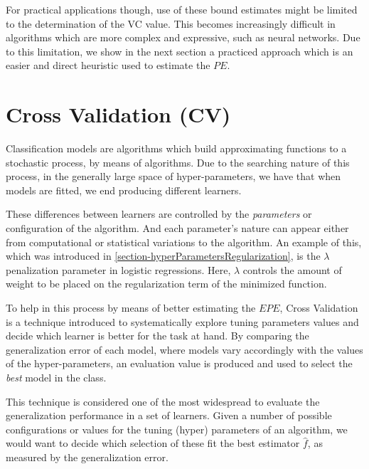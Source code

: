 For practical applications though, use of these bound estimates might be limited to the determination of the VC value. This becomes increasingly difficult in algorithms which are more complex and expressive, such as neural networks. 
Due to this limitation, we show in the next section a practiced approach which is an easier and direct heuristic used to estimate the $PE$.



\section{Cross Validation (CV)}\label{section:crossValidation}

Classification models are algorithms which build approximating functions to a stochastic process, by means of algorithms. Due to the searching nature of this process, in the generally large space of hyper-parameters, we have that when models are fitted, we end producing different learners. 
 
These differences between learners are controlled by the \textit{parameters} or configuration of the algorithm. 
And each parameter's nature can appear either from computational or statistical variations to the algorithm.
An example of this, which was introduced in \cref{section-hyperParametersRegularization}, is the $\lambda$ penalization parameter in logistic regressions. 
Here, $\lambda$ controls the amount of weight to be placed on the regularization term of the minimized function.

To help in this process by means of better estimating the $EPE$, Cross Validation is a technique introduced to systematically explore tuning parameters values and decide which learner is better for the task at hand. 
By comparing the generalization error of each model, where models vary accordingly with the values of the hyper-parameters, an evaluation value is produced and used to select the \textit{best} model in the class.

This technique is considered one of the most widespread to evaluate the generalization performance in a set of learners.
Given a number of possible configurations or values for the tuning (hyper) parameters of an algorithm, we would want to decide which selection of these fit the best estimator $\hat{f}$, as measured by the generalization error.

%

